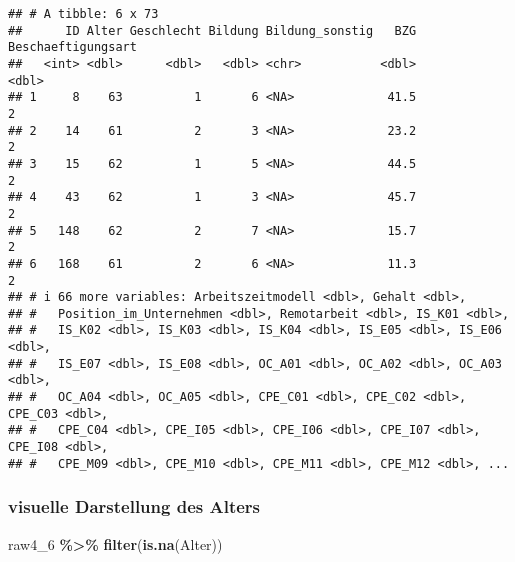 \documentclass[
]{article}
\newenvironment{Shaded}{\begin{snugshade}}{\end{snugshade}}
\newcommand{\AttributeTok}[1]{\textcolor[rgb]{0.13,0.29,0.53}{#1}}
\newcommand{\ConstantTok}[1]{\textcolor[rgb]{0.56,0.35,0.01}{#1}}
\newcommand{\FunctionTok}[1]{\textcolor[rgb]{0.13,0.29,0.53}{\textbf{#1}}}
\newcommand{\NormalTok}[1]{#1}
\newcommand{\OtherTok}[1]{\textcolor[rgb]{0.56,0.35,0.01}{#1}}
\newcommand{\SpecialCharTok}[1]{\textcolor[rgb]{0.81,0.36,0.00}{\textbf{#1}}}
\begin{document}
\begin{verbatim}
## # A tibble: 6 x 73
##      ID Alter Geschlecht Bildung Bildung_sonstig   BZG Beschaeftigungsart
##   <int> <dbl>      <dbl>   <dbl> <chr>           <dbl>              <dbl>
## 1     8    63          1       6 <NA>             41.5                  2
## 2    14    61          2       3 <NA>             23.2                  2
## 3    15    62          1       5 <NA>             44.5                  2
## 4    43    62          1       3 <NA>             45.7                  2
## 5   148    62          2       7 <NA>             15.7                  2
## 6   168    61          2       6 <NA>             11.3                  2
## # i 66 more variables: Arbeitszeitmodell <dbl>, Gehalt <dbl>,
## #   Position_im_Unternehmen <dbl>, Remotarbeit <dbl>, IS_K01 <dbl>,
## #   IS_K02 <dbl>, IS_K03 <dbl>, IS_K04 <dbl>, IS_E05 <dbl>, IS_E06 <dbl>,
## #   IS_E07 <dbl>, IS_E08 <dbl>, OC_A01 <dbl>, OC_A02 <dbl>, OC_A03 <dbl>,
## #   OC_A04 <dbl>, OC_A05 <dbl>, CPE_C01 <dbl>, CPE_C02 <dbl>, CPE_C03 <dbl>,
## #   CPE_C04 <dbl>, CPE_I05 <dbl>, CPE_I06 <dbl>, CPE_I07 <dbl>, CPE_I08 <dbl>,
## #   CPE_M09 <dbl>, CPE_M10 <dbl>, CPE_M11 <dbl>, CPE_M12 <dbl>, ...
\end{verbatim}

\subsubsection{visuelle Darstellung des
Alters}\label{visuelle-darstellung-des-alters}

\begin{Shaded}
\end{Shaded}

\begin{Shaded}
\begin{Highlighting}[]
\NormalTok{raw4\_6 }\SpecialCharTok{\%\textgreater{}\%} 
  \FunctionTok{filter}\NormalTok{(}\FunctionTok{is.na}\NormalTok{(Alter))}
\end{Highlighting}
\end{Shaded}
\end{document}
